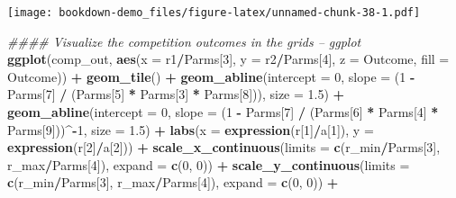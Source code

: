 \documentclass[
]{book}
\newenvironment{Shaded}{\begin{snugshade}}{\end{snugshade}}
\newcommand{\CommentTok}[1]{\textcolor[rgb]{0.56,0.35,0.01}{\textit{#1}}}
\newcommand{\DataTypeTok}[1]{\textcolor[rgb]{0.13,0.29,0.53}{#1}}
\newcommand{\DecValTok}[1]{\textcolor[rgb]{0.00,0.00,0.81}{#1}}
\newcommand{\FloatTok}[1]{\textcolor[rgb]{0.00,0.00,0.81}{#1}}
\newcommand{\KeywordTok}[1]{\textcolor[rgb]{0.13,0.29,0.53}{\textbf{#1}}}
\newcommand{\NormalTok}[1]{#1}
\newcommand{\OperatorTok}[1]{\textcolor[rgb]{0.81,0.36,0.00}{\textbf{#1}}}
\newcommand{\StringTok}[1]{\textcolor[rgb]{0.31,0.60,0.02}{#1}}
\begin{document}
\texttt{[image: bookdown-demo\_files/figure-latex/unnamed-chunk-38-1.pdf]}

\begin{Shaded}
\begin{Highlighting}[]
\CommentTok{#### Visualize the competition outcomes in the grids -- ggplot}
\KeywordTok{ggplot}\NormalTok{(comp_out, }\KeywordTok{aes}\NormalTok{(}\DataTypeTok{x =}\NormalTok{ r1}\OperatorTok{/}\NormalTok{Parms[}\DecValTok{3}\NormalTok{], }\DataTypeTok{y =}\NormalTok{ r2}\OperatorTok{/}\NormalTok{Parms[}\DecValTok{4}\NormalTok{], }\DataTypeTok{z =}\NormalTok{ Outcome, }\DataTypeTok{fill =}\NormalTok{ Outcome)) }\OperatorTok{+}
\StringTok{  }\KeywordTok{geom_tile}\NormalTok{() }\OperatorTok{+}
\StringTok{  }\KeywordTok{geom_abline}\NormalTok{(}\DataTypeTok{intercept =} \DecValTok{0}\NormalTok{, }\DataTypeTok{slope =}\NormalTok{ (}\DecValTok{1} \OperatorTok{-}\StringTok{ }\NormalTok{Parms[}\DecValTok{7}\NormalTok{] }\OperatorTok{/}\StringTok{ }\NormalTok{(Parms[}\DecValTok{5}\NormalTok{] }\OperatorTok{*}\StringTok{ }\NormalTok{Parms[}\DecValTok{3}\NormalTok{] }\OperatorTok{*}\StringTok{ }\NormalTok{Parms[}\DecValTok{8}\NormalTok{])), }\DataTypeTok{size =} \FloatTok{1.5}\NormalTok{) }\OperatorTok{+}
\StringTok{  }\KeywordTok{geom_abline}\NormalTok{(}\DataTypeTok{intercept =} \DecValTok{0}\NormalTok{, }\DataTypeTok{slope =}\NormalTok{ (}\DecValTok{1} \OperatorTok{-}\StringTok{ }\NormalTok{Parms[}\DecValTok{7}\NormalTok{] }\OperatorTok{/}\StringTok{ }\NormalTok{(Parms[}\DecValTok{6}\NormalTok{] }\OperatorTok{*}\StringTok{ }\NormalTok{Parms[}\DecValTok{4}\NormalTok{] }\OperatorTok{*}\StringTok{ }\NormalTok{Parms[}\DecValTok{9}\NormalTok{]))}\OperatorTok{^-}\DecValTok{1}\NormalTok{, }\DataTypeTok{size =} \FloatTok{1.5}\NormalTok{) }\OperatorTok{+}
\StringTok{  }\KeywordTok{labs}\NormalTok{(}\DataTypeTok{x =} \KeywordTok{expression}\NormalTok{(r[}\DecValTok{1}\NormalTok{]}\OperatorTok{/}\NormalTok{a[}\DecValTok{1}\NormalTok{]), }\DataTypeTok{y =} \KeywordTok{expression}\NormalTok{(r[}\DecValTok{2}\NormalTok{]}\OperatorTok{/}\NormalTok{a[}\DecValTok{2}\NormalTok{])) }\OperatorTok{+}
\StringTok{  }\KeywordTok{scale_x_continuous}\NormalTok{(}\DataTypeTok{limits =} \KeywordTok{c}\NormalTok{(r_min}\OperatorTok{/}\NormalTok{Parms[}\DecValTok{3}\NormalTok{], r_max}\OperatorTok{/}\NormalTok{Parms[}\DecValTok{4}\NormalTok{]), }\DataTypeTok{expand =} \KeywordTok{c}\NormalTok{(}\DecValTok{0}\NormalTok{, }\DecValTok{0}\NormalTok{)) }\OperatorTok{+}
\StringTok{  }\KeywordTok{scale_y_continuous}\NormalTok{(}\DataTypeTok{limits =} \KeywordTok{c}\NormalTok{(r_min}\OperatorTok{/}\NormalTok{Parms[}\DecValTok{3}\NormalTok{], r_max}\OperatorTok{/}\NormalTok{Parms[}\DecValTok{4}\NormalTok{]), }\DataTypeTok{expand =} \KeywordTok{c}\NormalTok{(}\DecValTok{0}\NormalTok{, }\DecValTok{0}\NormalTok{)) }\OperatorTok{+}

\end{Highlighting}
\end{Shaded}
\end{document}
